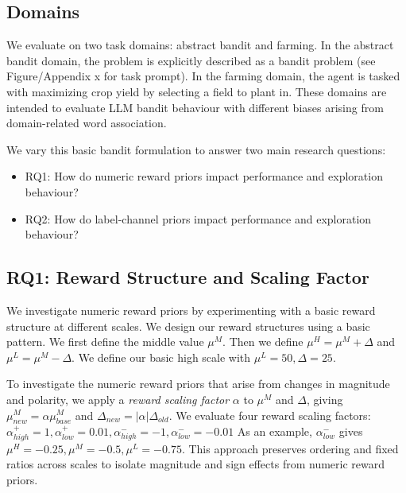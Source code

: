 \documentclass{article} %
\begin{document}
\subsection*{Domains}
We evaluate on two task domains: abstract bandit and farming. In the abstract bandit domain, the problem is explicitly described as a bandit problem (see Figure/Appendix x for task prompt). In the farming domain, the agent is tasked with maximizing crop yield by selecting a field to plant in. These domains are intended to evaluate LLM bandit behaviour with different biases arising from domain-related word association.

We vary this basic bandit formulation to answer two main research questions:
\begin{itemize}
    \item RQ1: How do numeric reward priors impact performance and exploration behaviour?
    \item RQ2: How do label-channel priors impact performance and exploration behaviour?
\end{itemize}

\subsection*{RQ1: Reward Structure and Scaling Factor}
We investigate numeric reward priors by experimenting with a basic reward structure at different scales.
We design our reward structures using a basic pattern. We first define the middle value $\mu^M$. Then we define $\mu^H = \mu^M + \Delta$ and $\mu^L = \mu^M - \Delta$. We define our basic high scale with $\mu^L = 50, \Delta = 25$. 

To investigate the numeric reward priors that arise from changes in magnitude and polarity, we apply a \textit{reward scaling factor} $\alpha$ to $\mu^M$ and $\Delta$, giving $\mu_{\mathit{new}}^M = \alpha \mu_{\mathit{base}}^M$ and $\Delta_{\mathit{new}} = |\alpha|\Delta_{\mathit{old}}$. We evaluate four reward scaling factors: $\alpha^+_{\mathit{high}} = 1, \alpha^+_{\mathit{low}} = 0.01, \alpha^-_{\mathit{high}} = -1, \alpha^-_{\mathit{low}} = -0.01$ As an example, $\alpha^-_{\mathit{low}}$ gives $\mu^H = -0.25, \mu^M = -0.5, \mu^L = -0.75$. This approach preserves ordering and fixed ratios across scales to isolate magnitude and sign effects from numeric reward priors.  %
\end{document}

